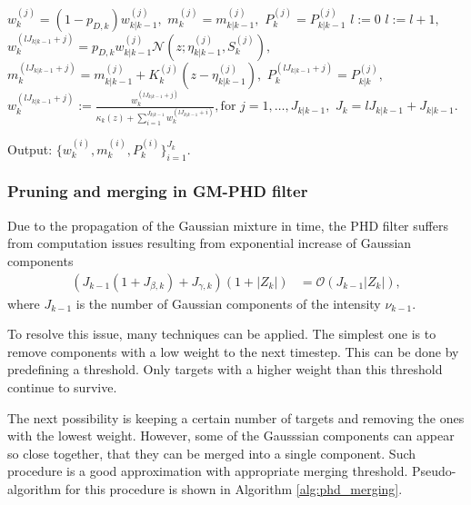 \begin{algorithm}[h]
\begin{algorithmic}[1]
        \State
         
            \State $w_k^{(j)} = (1 - p_{D,k}) w_{k|k-1}^{(j)},$ \quad
             $m_k^{(j)} = m_{k|k-1}^{(j)},$ \quad
             $P_k^{(j)} = P_{k|k-1}^{(j)}$
        \EndFor
        \State $l:=0$
         
            \State $l:=l+1,$
                \State $w_k^{(l J_{k|k-1} + j)} = p_{D,k} w_{k|k-1}^{(j)} \mathcal{N}(z; \eta_{k|k-1}^{(j)},S_k^{(j)}),$
                \State $m_k^{(l J_{k|k-1} + j)} = m_{k|k-1}^{(j)} + K_k^{(j)} (z - \eta_{k|k-1}^{(j)}),$
                \State $P_k^{(l J_{k|k-1} + j)} = P_{k|k}^{(j)},$
            \EndFor
        \State $w_k^{(l J_{k|k-1} + j)} := \frac{w_k^{(l J_{k|k-1} + j)}}{\kappa_k(z) + \sum_{i=1}^{J_{k|k-1}} w_k^{(
            l J_{k|k-1} + i)}}, \text{for $j = 1,\dots,J_{k|k-1}$},$
        \EndFor
        \State $J_k = l J_{k|k-1} + J_{k|k-1}.$
        \EndProcedure

        \State Output: $\{ w_k^{(i)}, m_k^{(i)}, P_k^{(i)} \}_{i=1}^{J_k}$.
    \end{algorithmic}
    \label{alg:phd}
\end{algorithm}

        \subsubsection{Pruning and merging in GM-PHD filter}
\label{sec:phd_pruning_and_merging}
Due to the propagation of the Gaussian mixture in time, the PHD filter suffers from computation issues resulting from
exponential increase of Gaussian components
\begin{align}
(J_{k-1} (1 + J_{\beta,k}) + J_{\gamma,k}) (1 + |Z_k|) &= \mathcal{O}(J_{k-1} |Z_k|),
\end{align}
where $J_{k-1}$ is the number of Gaussian components of the intensity $\nu_{k-1}$.

To resolve this issue, many techniques can be applied. The simplest one is to remove components with a low weight to the next timestep. This can be done by predefining a threshold. Only targets with a higher weight than this threshold continue to survive.

The next possibility is keeping a certain number of targets and removing the ones with the lowest weight. However,
some of the Gausssian components can appear so close together, that they can be merged into a single component. Such
procedure is a good approximation with appropriate merging threshold. Pseudo-algorithm for this procedure is shown in Algorithm \ref{alg:phd_merging}.

